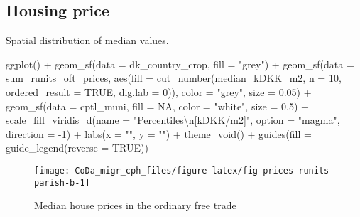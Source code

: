\documentclass[
  12pt,
]{article}
\newenvironment{Shaded}{\begin{snugshade}}{\end{snugshade}}
\newcommand{\AttributeTok}[1]{\textcolor[rgb]{0.77,0.63,0.00}{#1}}
\newcommand{\ConstantTok}[1]{\textcolor[rgb]{0.00,0.00,0.00}{#1}}
\newcommand{\DecValTok}[1]{\textcolor[rgb]{0.00,0.00,0.81}{#1}}
\newcommand{\FloatTok}[1]{\textcolor[rgb]{0.00,0.00,0.81}{#1}}
\newcommand{\FunctionTok}[1]{\textcolor[rgb]{0.00,0.00,0.00}{#1}}
\newcommand{\NormalTok}[1]{#1}
\newcommand{\SpecialCharTok}[1]{\textcolor[rgb]{0.00,0.00,0.00}{#1}}
\newcommand{\StringTok}[1]{\textcolor[rgb]{0.31,0.60,0.02}{#1}}
\begin{document}
\hypertarget{housing-price-1}{%
\subsection{Housing price}\label{housing-price-1}}

Spatial distribution of median values.

\begin{Shaded}
\begin{Highlighting}[]
\FunctionTok{ggplot}\NormalTok{() }\SpecialCharTok{+}
  \FunctionTok{geom\_sf}\NormalTok{(}\AttributeTok{data =}\NormalTok{ dk\_country\_crop, }\AttributeTok{fill =} \StringTok{"grey"}\NormalTok{) }\SpecialCharTok{+} 
  \FunctionTok{geom\_sf}\NormalTok{(}\AttributeTok{data =}\NormalTok{ sum\_runits\_oft\_prices,}
          \FunctionTok{aes}\NormalTok{(}\AttributeTok{fill =} \FunctionTok{cut\_number}\NormalTok{(median\_kDKK\_m2,}
                                \AttributeTok{n =} \DecValTok{10}\NormalTok{,}
                                \AttributeTok{ordered\_result =} \ConstantTok{TRUE}\NormalTok{,}
                                \AttributeTok{dig.lab =} \DecValTok{0}\NormalTok{)),}
          \AttributeTok{color =} \StringTok{"grey"}\NormalTok{,}
          \AttributeTok{size =} \FloatTok{0.05}\NormalTok{) }\SpecialCharTok{+}
  \FunctionTok{geom\_sf}\NormalTok{(}\AttributeTok{data =}\NormalTok{ cptl\_muni, }\AttributeTok{fill =} \ConstantTok{NA}\NormalTok{, }\AttributeTok{color =} \StringTok{"white"}\NormalTok{, }\AttributeTok{size =} \FloatTok{0.5}\NormalTok{) }\SpecialCharTok{+}
  \FunctionTok{scale\_fill\_viridis\_d}\NormalTok{(}\AttributeTok{name =} \StringTok{"Percentiles}\SpecialCharTok{\textbackslash{}n}\StringTok{[kDKK/m2]"}\NormalTok{,}
                     \AttributeTok{option =} \StringTok{"magma"}\NormalTok{,}
                     \AttributeTok{direction =} \SpecialCharTok{{-}}\DecValTok{1}\NormalTok{) }\SpecialCharTok{+}
  \FunctionTok{labs}\NormalTok{(}\AttributeTok{x =} \StringTok{""}\NormalTok{,}
       \AttributeTok{y =} \StringTok{""}\NormalTok{) }\SpecialCharTok{+}
  \FunctionTok{theme\_void}\NormalTok{() }\SpecialCharTok{+}
  \FunctionTok{guides}\NormalTok{(}\AttributeTok{fill =} \FunctionTok{guide\_legend}\NormalTok{(}\AttributeTok{reverse =} \ConstantTok{TRUE}\NormalTok{))}
\end{Highlighting}
\end{Shaded}

\begin{figure}[H]

{\centering \texttt{[image: CoDa\_migr\_cph\_files/figure-latex/fig-prices-runits-parish-b-1]} 

}

\caption{Median house prices in the ordinary free trade}\label{fig:fig-prices-runits-parish-b}
\end{figure}
\end{document}
